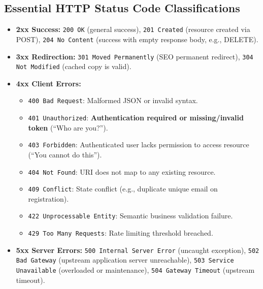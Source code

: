 \subsection{Essential HTTP Status Code Classifications}
\begin{itemize}
    \item \textbf{2xx Success:} \texttt{200 OK} (general success), \texttt{201 Created} (resource created via POST), \texttt{204 No Content} (success with empty response body, e.g., DELETE).
    \item \textbf{3xx Redirection:} \texttt{301 Moved Permanently} (SEO permanent redirect), \texttt{304 Not Modified} (cached copy is valid).
    \item \textbf{4xx Client Errors:}
    \begin{itemize}
        \item \texttt{400 Bad Request}: Malformed JSON or invalid syntax.
        \item \texttt{401 Unauthorized}: \textbf{Authentication required or missing/invalid token} (``Who are you?'').
        \item \texttt{403 Forbidden}: Authenticated user lacks permission to access resource (``You cannot do this'').
        \item \texttt{404 Not Found}: URI does not map to any existing resource.
        \item \texttt{409 Conflict}: State conflict (e.g., duplicate unique email on registration).
        \item \texttt{422 Unprocessable Entity}: Semantic business validation failure.
        \item \texttt{429 Too Many Requests}: Rate limiting threshold breached.
    \end{itemize}
    \item \textbf{5xx Server Errors:} \texttt{500 Internal Server Error} (uncaught exception), \texttt{502 Bad Gateway} (upstream application server unreachable), \texttt{503 Service Unavailable} (overloaded or maintenance), \texttt{504 Gateway Timeout} (upstream timeout).
\end{itemize}

